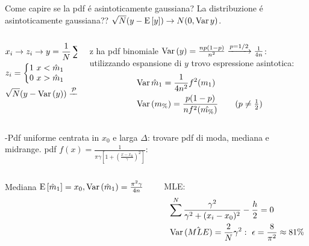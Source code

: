 \documentclass[asd-beamer.tex]{subfiles}%
\begin{document}
\begin{frame}{Come capire se la pdf \'e asintoticamente gaussiana?}
	La distribuzione \'e asintoticamente gaussiana?? $\sqrt{N}(y-\operatorname{E}{[y]})\to N(0,\operatorname{Var}{y})$.
	\begin{columns}[T]
		\begin{column}{0.5\textwidth}
			\begin{align*}
				&x_i\to z_i\to y=\frac{1}{N}\sum z_i\\
				&z_i=\left\{\begin{matrix}1\ x<\hat{m}_1\\0\ x>\hat{m}_1\\\end{matrix}\right.\\
				&\sqrt{N}(y-\operatorname{Var}{(y)})\xrightarrow{\operatorname{\mathcal{P}}{}}N(0,\operatorname{Var}{(y)})
			\end{align*}
		\end{column}
		\begin{column}{0.5\textwidth}
			z ha pdf binomiale $\operatorname{Var}{(y)}=\frac{np(1-p)}{n^2}\xrightarrow{p=1/2}\frac{1}{4n}$: utilizzando espansione di $y$ trovo espressione asintotica:
            \begin{align*}
                &\var{\hat{m}_1}=\frac{1}{4n^2}f^2(m_1)\\
                &\var{(m_{\%})}=\frac{p(1-p)}{nf^2(\hat{m_{\%}})}\tag{$p\neq\frac{1}{2}$}
            \end{align*}
		\end{column}
	\end{columns}
	-Pdf uniforme centrata in $x_0$ e larga $\Delta$: trovare pdf di moda, mediana e midrange.
	pdf $f(x)=\frac{1}{\pi\gamma[1+(\frac{x-x_0}{\gamma})^2]}$:
	\begin{columns}[T]
		\begin{column}{0.5\textwidth}
			Mediana
			$\operatorname{E}{[\hat{m}_1]}=x_0, \operatorname{Var}{(\hat{m}_1)}=\frac{\pi^2\gamma}{4n}$
		\end{column}
		\begin{column}{0.5\textwidth}
			MLE:
			\begin{align*}
				&\sum^N\frac{\gamma^2}{\gamma^2+(x_i-x_0)^2}-\frac{h}{2}=0\\
				&\operatorname{Var}{(\hat{MLE})}=\frac{2}{N}\gamma^2:\ \epsilon=\frac{8}{\pi^2}\approx81\%
			\end{align*}
		\end{column}
	\end{columns}

\end{frame}
\end{document}
